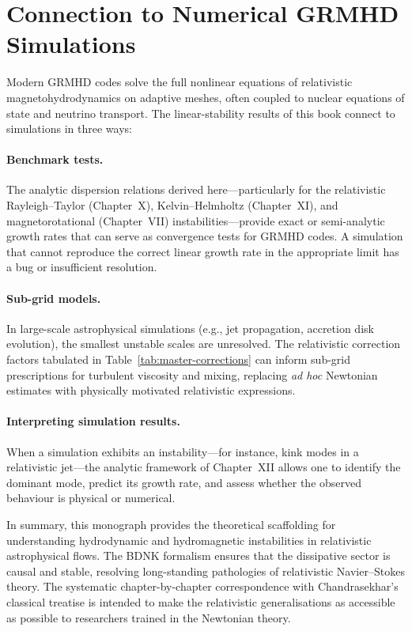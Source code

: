 \section{Connection to Numerical GRMHD Simulations}
\label{sec:grmhd-connection}

Modern GRMHD codes solve the full nonlinear equations of relativistic
magnetohydrodynamics on adaptive meshes, often coupled to nuclear
equations of state and neutrino transport.  The linear-stability results of
this book connect to simulations in three ways:

\paragraph{Benchmark tests.}
The analytic dispersion relations derived here---particularly for the
relativistic Rayleigh--Taylor (Chapter~X), Kelvin--Helmholtz (Chapter~XI),
and magnetorotational (Chapter~VII) instabilities---provide exact or
semi-analytic growth rates that can serve as convergence tests for GRMHD
codes.  A simulation that cannot reproduce the correct linear growth rate in
the appropriate limit has a bug or insufficient resolution.

\paragraph{Sub-grid models.}
In large-scale astrophysical simulations (e.g., jet propagation, accretion
disk evolution), the smallest unstable scales are unresolved.  The
relativistic correction factors tabulated in
Table~\ref{tab:master-corrections} can inform sub-grid prescriptions for
turbulent viscosity and mixing, replacing \emph{ad hoc} Newtonian estimates
with physically motivated relativistic expressions.

\paragraph{Interpreting simulation results.}
When a simulation exhibits an instability---for instance, kink modes in a
relativistic jet---the analytic framework of Chapter~XII allows one to
identify the dominant mode, predict its growth rate, and assess whether the
observed behaviour is physical or numerical.

\bigskip
\noindent
In summary, this monograph provides the theoretical scaffolding for
understanding hydrodynamic and hydromagnetic instabilities in relativistic
astrophysical flows.  The BDNK formalism ensures that the dissipative sector
is causal and stable, resolving long-standing pathologies of relativistic
Navier--Stokes theory.  The systematic chapter-by-chapter correspondence with
Chandrasekhar's classical treatise is intended to make the relativistic
generalisations as accessible as possible to researchers trained in the
Newtonian theory.

